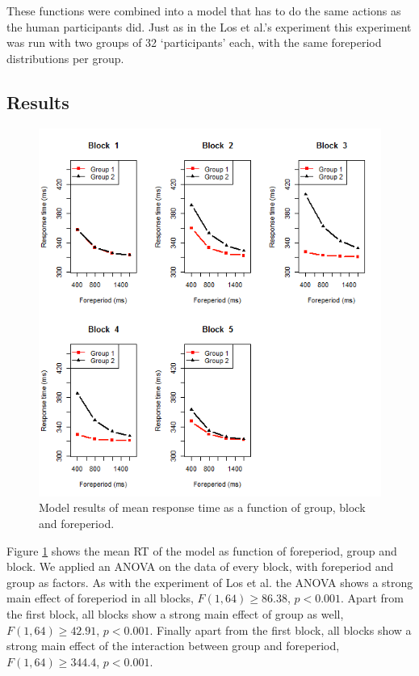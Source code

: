 \documentclass[10pt,letterpaper]{article}
\begin{document}
\noindent These functions were combined into a model that has to do the same actions as the human participants did. Just as in the Los et al.'s experiment this experiment was run with two groups of 32 `participants' each, with the same foreperiod distributions per group.

\subsection{Results}
\begin{figure}
	\centering
	\includegraphics[width=\columnwidth]{5blocks2.png}
	\caption{Model results of mean response time as a function of group, block and foreperiod.}
	\label{5blocks}
\end{figure}
Figure \ref{5blocks} shows the mean RT of the model as function of foreperiod, group and block. We applied an ANOVA on the data of every block, with foreperiod and group as factors. As with the experiment of Los et al. the ANOVA shows a strong main effect of foreperiod in all blocks, $F(1,64) \geq 86.38$, $p < 0.001$. Apart from the first block, all blocks show a strong main effect of group as well, $F(1,64) \geq 42.91$, $p < 0.001$. Finally apart from the first block, all blocks show a strong main effect of the interaction between group and foreperiod, $F(1,64) \geq 344.4$, $p < 0.001$.
\end{document}
